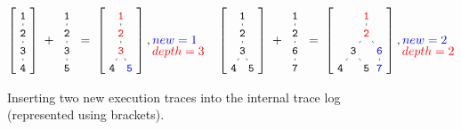 \documentclass[sigconf, anonymous, review]{acmart}
\begin{document}
\begin{figure}[b]
\scriptsize
\newcommand\stacked[2]{\underset{\textstyle #2\mathstrut}{#1}}
\begin{align*}
  \nonumber
  \left[
  \tikz[
    baseline=-8mm,
    level distance=0.5cm,
    level 1/.style={sibling distance=0.5cm},
    level 2/.style={sibling distance=0.5cm}
  ]{
    \node {\small \texttt{1}}
      child {node {\small \texttt{2}}
        child {node {\small \texttt{3}}
          child {node {\small \texttt{4}}}
        }
      }
  }
  \right]
  \;
  +
  \;
  \tikz[
    baseline=-8mm,
    level distance=0.5cm,
    level 1/.style={sibling distance=0.5cm},
    level 2/.style={sibling distance=0.5cm}
  ]{
    \node {\small \texttt{1}}
      child {node {\small \texttt{2}}
        child {node {\small \texttt{3}}
          child {node {\small \texttt{5}}}
        }
      }
  }
  \;
  =
  \;
  \left[
  \tikz[
    baseline=-8mm,
    level distance=0.5cm,
    level 1/.style={sibling distance=0.5cm},
    level 2/.style={sibling distance=0.5cm}
  ]{
    \node {\color{red} \small \texttt{1}}
      child {node {\color{red} \small \texttt{2}}
        child {node {\color{red} \small \texttt{3}}
          child {node {\small \texttt{4}}}
          child {node {\color{blue} \small \texttt{5}}}
        }
      }
  }
  \right]
  ,
  \stacked{{\color{blue} new=1\phantom{x}}}{{\color{red} depth=3}}
  \quad
  \left[
  \tikz[
    baseline=-8mm,
    level distance=0.5cm,
    level 1/.style={sibling distance=0.5cm},
    level 2/.style={sibling distance=0.5cm}
  ]{
    \node {\small \texttt{1}}
      child {node {\small \texttt{2}}
        child {node {\small \texttt{3}}
          child {node {\small \texttt{4}}}
          child {node {\small \texttt{5}}}
        }
      }
  }
  \right]
  \;
  +
  \;
  \tikz[
    baseline=-8mm,
    level distance=0.5cm,
    level 1/.style={sibling distance=0.5cm},
    level 2/.style={sibling distance=0.5cm}
  ]{
    \node {\small \texttt{1}}
      child {node {\small \texttt{2}}
        child {node {\small \texttt{6}}
          child {node {\small \texttt{7}}
          }
        }
      }
  }
  \;
  =
  \;
  \left[
  \tikz[
    baseline=-8mm,
    level distance=0.5cm,
    level 1/.style={sibling distance=0.5cm},
    level 2/.style={sibling distance=0.75cm}
  ]{
    \node {\color{red} \small \texttt{1}}
      child {node {\color{red} \small \texttt{2}}
        child {node {\small \texttt{3}}
          child {node {\small \texttt{4}}}
          child {node {\small \texttt{5}}}
        }
        child {node {\color{blue}\small \texttt{6}}
          child {node {\color{blue}\small \texttt{7}}}
        }
      }
  }
  \right]
  ,
  \stacked{{\color{blue} new=2\phantom{x}}}{{\color{red} depth=2}}
\end{align*}
\vspace{-10pt}
\caption{\label{fig:mutagen:tracelog}Inserting two new execution traces into the
  internal trace log (represented using brackets).}
\end{figure}
\end{document}
